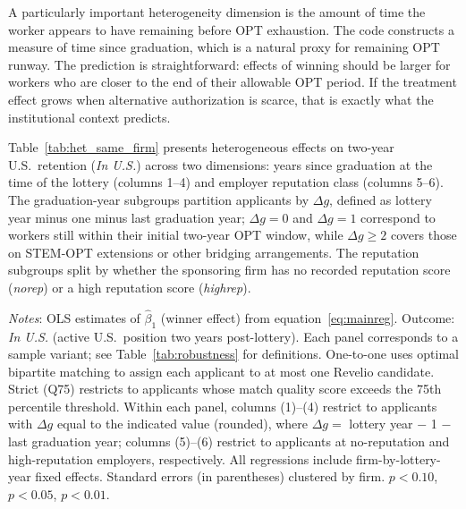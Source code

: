 A particularly important heterogeneity dimension is the amount of time the worker appears to have remaining before OPT exhaustion. The code constructs a measure of time since graduation, which is a natural proxy for remaining OPT runway. The prediction is straightforward: effects of winning should be larger for workers who are closer to the end of their allowable OPT period. If the treatment effect grows when alternative authorization is scarce, that is exactly what the institutional context predicts.

Table~\ref{tab:het_same_firm} presents heterogeneous effects on two-year U.S.\ retention (\textit{In U.S.}) across two dimensions: years since graduation at the time of the lottery (columns 1--4) and employer reputation class (columns 5--6). The graduation-year subgroups partition applicants by $\Delta g$, defined as lottery year minus one minus last graduation year; $\Delta g = 0$ and $\Delta g = 1$ correspond to workers still within their initial two-year OPT window, while $\Delta g \geq 2$ covers those on STEM-OPT extensions or other bridging arrangements. The reputation subgroups split by whether the sponsoring firm has no recorded reputation score (\textit{norep}) or a high reputation score (\textit{highrep}).

\begin{table}[htbp]
\centering
\caption{Heterogeneous Effects on Two-Year U.S.\ Retention by Years Since Graduation and Employer Reputation}
\label{tab:het_same_firm}
\footnotesize

\begin{tablenotes}
\item \textit{Notes}: OLS estimates of $\hat\beta_1$ (winner effect) from equation~\eqref{eq:mainreg}. Outcome: \textit{In U.S.} (active U.S.\ position two years post-lottery). Each panel corresponds to a sample variant; see Table~\ref{tab:robustness} for definitions. One-to-one uses optimal bipartite matching to assign each applicant to at most one Revelio candidate. Strict (Q75) restricts to applicants whose match quality score exceeds the 75th percentile threshold. Within each panel, columns (1)--(4) restrict to applicants with $\Delta g$ equal to the indicated value (rounded), where $\Delta g = $ lottery year $-$ 1 $-$ last graduation year; columns (5)--(6) restrict to applicants at no-reputation and high-reputation employers, respectively. All regressions include firm-by-lottery-year fixed effects. Standard errors (in parentheses) clustered by firm. \sym{*} $p<0.10$, \sym{**} $p<0.05$, \sym{***} $p<0.01$.
\end{tablenotes}
\end{table}

